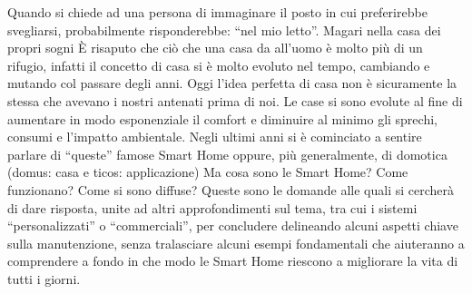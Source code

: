 Quando si chiede ad una persona di immaginare il posto in cui preferirebbe svegliarsi, probabilmente risponderebbe: “nel mio letto”. Magari nella casa dei propri sogni 
È risaputo che ciò che una casa da all’uomo è molto più di un rifugio, infatti il concetto di casa si è molto evoluto nel tempo, cambiando e mutando col passare degli anni.
Oggi l’idea perfetta di casa non è sicuramente la stessa che avevano i nostri antenati prima di noi. 
Le case si sono evolute al fine di aumentare in modo esponenziale il comfort e diminuire al minimo gli sprechi, consumi e l’impatto ambientale.
Negli ultimi anni si è cominciato a sentire parlare di “queste” famose Smart Home oppure, più generalmente, di domotica (domus: casa e ticos: applicazione)
Ma cosa sono le Smart Home? Come funzionano? Come si sono diffuse?
Queste sono le domande alle quali si cercherà di dare risposta, unite ad altri approfondimenti sul tema, tra cui i sistemi “personalizzati” o “commerciali”, per concludere delineando alcuni aspetti chiave sulla manutenzione, senza tralasciare alcuni esempi fondamentali che aiuteranno a comprendere a fondo in che modo le Smart Home riescono a migliorare la vita di tutti i giorni.
